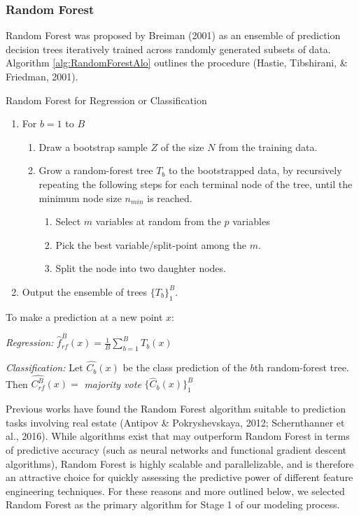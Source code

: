 \documentclass[12pt,]{article}
\begin{document}
\hypertarget{random-forest}{%
\subsubsection{Random Forest}\label{random-forest}}

Random Forest was proposed by Breiman (2001) as an ensemble of
prediction decision trees iteratively trained across randomly generated
subsets of data. Algorithm \ref{alg:RandomForestAlo} outlines the
procedure (Hastie, Tibshirani, \& Friedman, 2001).

\begin{algorithm}
  \caption{Random Forest for Regression or Classification}\label{alg:RandomForestAlo}

\begin{enumerate}
  \item For $b = 1$ to $B$
  \begin{enumerate}
    \item Draw a bootstrap sample $Z$ of the size $N$ from the training data.
    \item Grow a random-forest tree $T_b$ to the bootstrapped data, by recursively repeating the following steps for each terminal node of the tree, until the minimum node size $n_{min}$ is reached.
  \begin{enumerate}
    \item Select $m$ variables at random from the $p$ variables
    \item Pick the best variable/split-point among the $m$.
    \item Split the node into two daughter nodes.
  \end{enumerate}
  \end{enumerate}
  \item Output the ensemble of trees $\{T_b\}_1^B$.
\end{enumerate}

To make a prediction at a new point $x$:

\textit{Regression:} $\hat{f}_{rf}^B(x) = \frac{1}{B}\sum_{b=1}^{B}T_b(x)$

\textit{Classification:} Let $\hat{C_b}(x)$ be the class prediction of the $b$th random-forest tree. Then $\hat{C_{rf}^B}(x)=$ \textit{majority vote} $\{\hat{C}_{b}(x)\}_1^B $

\end{algorithm}

Previous works have found the Random Forest algorithm suitable to
prediction tasks involving real estate (Antipov \& Pokryshevskaya, 2012;
Schernthanner et al., 2016). While algorithms exist that may outperform
Random Forest in terms of predictive accuracy (such as neural networks
and functional gradient descent algorithms), Random Forest is highly
scalable and parallelizable, and is therefore an attractive choice for
quickly assessing the predictive power of different feature engineering
techniques. For these reasons and more outlined below, we selected
Random Forest as the primary algorithm for Stage 1 of our modeling
process.
\end{document}
